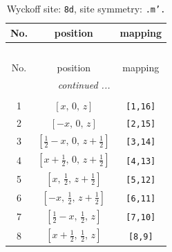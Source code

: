 \documentclass[fleqn,8pt]{jsarticle}
\begin{document}
\begin{longtable}{ccc}
\caption{Wyckoff site: {\tt 8d}, site symmetry: {\tt .m'.}}
 \\
 \hline \hline
No. & position & mapping \\ \hline \endfirsthead

\multicolumn{2}{l}{\tablename\ \thetable{}} \\
 \hline \hline
No. & position & mapping \\ \hline \endhead

 \hline \hline
\multicolumn{2}{r}{\footnotesize\it continued ...} \\ \endfoot

 \hline \hline
\multicolumn{2}{r}{} \\ \endlastfoot

1 & $\left[ x,\, 0,\, z \right]$ & {\tt [1,16]} \\ \hline
2 & $\left[ - x,\, 0,\, z \right]$ & {\tt [2,15]} \\ \hline
3 & $\left[ \frac{1}{2} - x,\, 0,\, z + \frac{1}{2} \right]$ & {\tt [3,14]} \\ \hline
4 & $\left[ x + \frac{1}{2},\, 0,\, z + \frac{1}{2} \right]$ & {\tt [4,13]} \\ \hline
5 & $\left[ x,\, \frac{1}{2},\, z + \frac{1}{2} \right]$ & {\tt [5,12]} \\ \hline
6 & $\left[ - x,\, \frac{1}{2},\, z + \frac{1}{2} \right]$ & {\tt [6,11]} \\ \hline
7 & $\left[ \frac{1}{2} - x,\, \frac{1}{2},\, z \right]$ & {\tt [7,10]} \\ \hline
8 & $\left[ x + \frac{1}{2},\, \frac{1}{2},\, z \right]$ & {\tt [8,9]} \\
\end{longtable}
\renewcommand{\arraystretch}{1.2}
\end{document}
